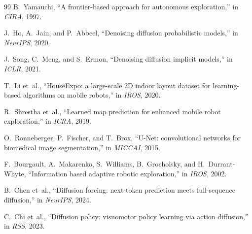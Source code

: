 \documentclass[conference]{IEEEtran}
\begin{document}
\begin{thebibliography}{99}
B.~Yamauchi,
``A frontier-based approach for autonomous exploration,'' in
\emph{CIRA}, 1997.

J.~Ho, A.~Jain, and P.~Abbeel,
``Denoising diffusion probabilistic models,''
in \emph{NeurIPS}, 2020.

J.~Song, C.~Meng, and S.~Ermon,
``Denoising diffusion implicit models,''
in \emph{ICLR}, 2021.

T.~Li et~al.,
``HouseExpo: a large-scale 2D indoor layout dataset for learning-based
algorithms on mobile robots,'' in \emph{IROS}, 2020.

R.~Shrestha et~al.,
``Learned map prediction for enhanced mobile robot exploration,''
in \emph{ICRA}, 2019.

O.~Ronneberger, P.~Fischer, and T.~Brox,
``U-Net: convolutional networks for biomedical image segmentation,''
in \emph{MICCAI}, 2015.

F.~Bourgault, A.~Makarenko, S.~Williams, B.~Grocholsky,
and H.~Durrant-Whyte,
``Information based adaptive robotic exploration,''
in \emph{IROS}, 2002.

B.~Chen et~al.,
``Diffusion forcing: next-token prediction meets full-sequence
diffusion,'' in \emph{NeurIPS}, 2024.

C.~Chi et~al.,
``Diffusion policy: visuomotor policy learning via action diffusion,''
in \emph{RSS}, 2023.

\end{thebibliography}
\end{document}
